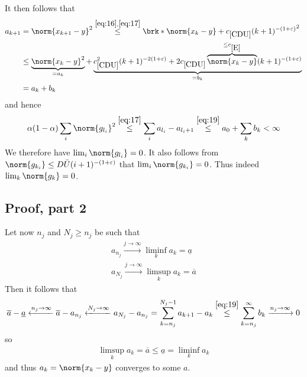 \begin{frame}
	\begin{proofs}
	It then follows that
	\begin{equation}
	\begin{aligned}
		a_{k+1} &= \norm{x_{k+1}-y}^2\stackrel{\eqref{eq:16}, \eqref{eq:17}}{\leq}\brk*{\norm{x_k-y}+\useconstant{CDU}(k+1)^{-(1+\e)}}^2 \\
		&\leq \underbrace{\norm{x_k-y}^2}_{=a_k}+\underbrace{\useconstant{CDU}^2(k+1)^{-2(1+\e)}+2\useconstant{CDU}\overbrace{\norm{x_k-y}}^{\leq \useconstant{E}}(k+1)^{-(1+\e)}}_{=b_k} \\
		&= a_k+b_k
	\end{aligned}
	\label{eq:19}
	\end{equation}
	and hence
	\begin{align*}
		\alpha(1-\alpha)\sum_i\norm{g_{l_i}}^2
		\stackrel{\eqref{eq:17}}{\leq} \sum_i a_{l_i}-a_{l_i+1}
		\stackrel{\eqref{eq:19}}{\leq}a_0+\sum_k b_k
		<\infty
	\end{align*}
	We therefore have $\lim_i\norm{g_{l_i}}=0$. It also follows from $\norm{g_{k_i}}\leq D\barU (i+1)^{-(1+\e)}$ that $\lim_i\norm{g_{k_i}}=0$. Thus indeed $\lim_k\norm{g_k}=0$.
	\end{proofs}
\end{frame}

\subsection{Proof, part 2}
\begin{frame}
	\begin{proofs}
	Let now $n_j$ and  $N_j\geq n_j$ be such that
	\begin{align*}
		a_{n_j}\xrightarrow{j\to\infty}\liminf_ka_k=\underline{a} \\
		a_{N_j}\xrightarrow{j\to\infty}\limsup_ka_k=\overline{a}	
	\end{align*}
	Then it follows that
	\begin{align*}
		\overline{a}-\underline{a}
		\xleftarrow{n_j\to\infty}\overline{a}-a_{n_j}
		\xleftarrow{N_j\to\infty}a_{N_j}-a_{n_j}
		= \sum_{k=n_j}^{N_j-1}a_{k+1}-a_k
		\stackrel{\eqref{eq:19}}{\leq} \sum_{k=n_j}^\infty b_k
		\xrightarrow{n_j\to\infty}0
	\end{align*}
	so
	\begin{align*}
		\limsup_ka_k=\overline{a}\leq \underline{a}=\liminf_ka_k
	\end{align*}
	and thus $a_k=\norm{x_k-y}$ converges to some $a$.
	\end{proofs}
\end{frame}

